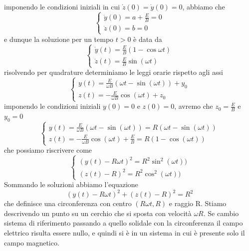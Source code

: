 imponendo le condizioni iniziali in cui $\dot{z}(0) = \dot{y}(0) = 0$, abbiamo che
\begin{equation*}
	\left \{ \begin{array}{l}
		\dot{y}(0) = a + \frac{E}{B} = 0 \\[0.3cm]
		\dot{z}(0) = b = 0
	\end{array}\right.
\end{equation*}
e dunque la soluzione per un tempo $t > 0$ \`e data da
\begin{equation*}
	\left \{ \begin{array}{l}
		\dot{y}(t) = \frac{E}{B}(1 - \cos \omega t)\\[0.3cm]
		\dot{z}(t) = \frac{E}{B}\sin (\omega t) 
	\end{array}\right.	
\end{equation*}
risolvendo per quadrature determiniamo le leggi orarie rispetto agli assi
\begin{equation*}
		\left \{ \begin{array}{l}
		y(t) = \frac{E}{\omega B} (\omega t - \sin(\omega t))  + y_0\\[0.3cm]
		z(t) = - \frac{E}{\omega B} \cos (\omega t) + z_0
	\end{array}\right.
\end{equation*}
imponendo le condizioni iniziali $y(0) = 0$ e $z(0) =0$, avremo che $z_0 = \frac{E}{B}$ e $y_0 = 0$
\begin{equation*}
		\left \{ \begin{array}{l}
		 y(t) = \frac{E}{\omega B} (\omega t - \sin(\omega t)) = R(\omega t - \sin(\omega t))  \\[0.3cm]
		z(t) = - \frac{E}{\omega B} \cos (\omega t) + \frac{E}{B} = R(1-\cos(\omega t))
	\end{array}\right.
\end{equation*}
che possiamo riscrivere come 
\begin{equation*}
		\left \{ \begin{array}{l}
		 (y(t) - R\omega t)^2 =  R^2\sin^2(\omega t))  \\[0.3cm]
		(z(t) - R)^2 = R^2\cos^2(\omega t))
	\end{array}\right.
\end{equation*}
Sommando le soluzioni abbiamo l'equazione 
\begin{equation*}
	 (y(t) - R\omega t)^2 + (z(t) - R)^2 = R^2
\end{equation*}
che definisce una circonferenza con centro $(R\omega t ,R)$ e raggio R.
Stiamo descrivendo un punto su un cerchio che si sposta con velocit\`a $\omega R$. Se cambio sistema di riferimento passando a quello solidale con la circonferenza il campo elettrico risulta essere nullo, e quindi si \`e in un sistema in cui \`e presente solo il campo magnetico.


